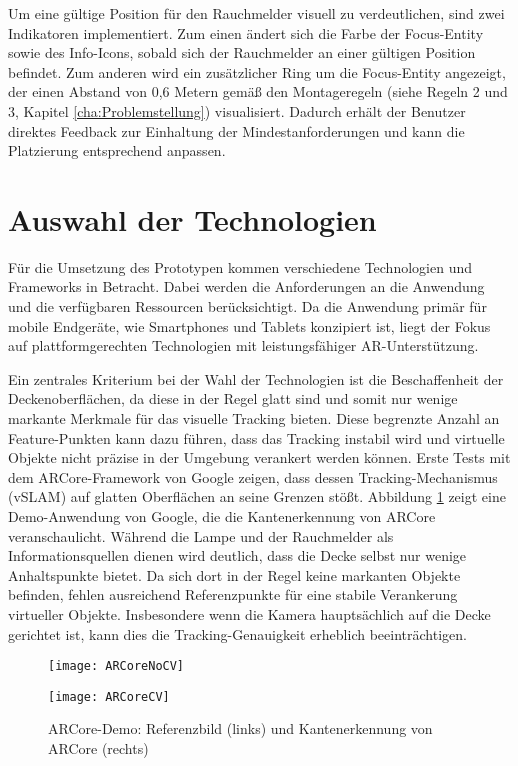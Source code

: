 Um eine gültige Position für den Rauchmelder visuell zu verdeutlichen, sind zwei Indikatoren implementiert. Zum einen ändert sich die Farbe der Focus-Entity sowie des Info-Icons, sobald sich der Rauchmelder an einer gültigen Position befindet. Zum anderen wird ein zusätzlicher Ring um die Focus-Entity angezeigt, der einen Abstand von 0,6 Metern gemäß den Montageregeln (siehe Regeln 2 und 3, Kapitel \ref{cha:Problemstellung}) visualisiert. Dadurch erhält der Benutzer direktes Feedback zur Einhaltung der Mindestanforderungen und kann die Platzierung entsprechend anpassen.

\section{Auswahl der Technologien}

Für die Umsetzung des Prototypen kommen verschiedene Technologien und Frameworks in Betracht. Dabei werden die Anforderungen an die Anwendung und die verfügbaren Ressourcen berücksichtigt. Da die Anwendung primär für mobile Endgeräte, wie Smartphones und Tablets konzipiert ist, liegt der Fokus auf plattformgerechten Technologien mit leistungsfähiger AR-Unterstützung.

Ein zentrales Kriterium bei der Wahl der Technologien ist die Beschaffenheit der Deckenoberflächen, da diese in der Regel glatt sind und somit nur wenige markante Merkmale für das visuelle Tracking bieten. Diese begrenzte Anzahl an Feature-Punkten kann dazu führen, dass das Tracking instabil wird und virtuelle Objekte nicht präzise in der Umgebung verankert werden können. Erste Tests mit dem ARCore-Framework von Google zeigen, dass dessen Tracking-Mechanismus (vSLAM) auf glatten Oberflächen an seine Grenzen stößt. Abbildung \ref{fig:ARCore} zeigt eine Demo-Anwendung von Google, die die Kantenerkennung von ARCore veranschaulicht. Während die Lampe und der Rauchmelder als Informationsquellen dienen wird deutlich, dass die Decke selbst nur wenige Anhaltspunkte bietet. Da sich dort in der Regel keine markanten Objekte befinden, fehlen ausreichend Referenzpunkte für eine stabile Verankerung virtueller Objekte. Insbesondere wenn die Kamera hauptsächlich auf die Decke gerichtet ist, kann dies die Tracking-Genauigkeit erheblich beeinträchtigen.

\begin{figure}[ht]
    \centering
    \begin{minipage}{0.45\textwidth}
        \centering
        \texttt{[image: ARCoreNoCV]}
    \end{minipage}
    \hfill
    \begin{minipage}{0.45\textwidth}
        \centering
        \texttt{[image: ARCoreCV]}
    \end{minipage}
    \caption{ARCore-Demo: Referenzbild (links) und Kantenerkennung von ARCore (rechts)}
    \label{fig:ARCore}
\end{figure}

